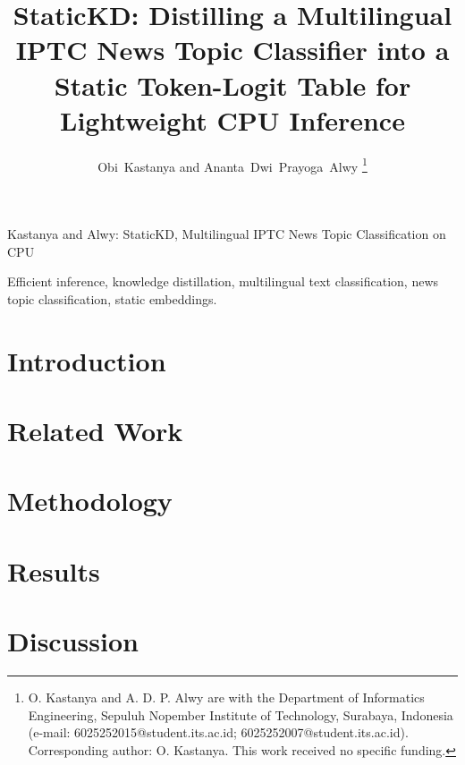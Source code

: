\documentclass[journal]{IEEEtran}
\begin{document}
\title{StaticKD: Distilling a Multilingual IPTC News Topic Classifier into a Static Token-Logit Table for Lightweight CPU Inference}

\author{Obi~Kastanya and Ananta~Dwi~Prayoga~Alwy%
\thanks{O. Kastanya and A. D. P. Alwy are with the Department of Informatics Engineering, Sepuluh Nopember Institute of Technology, Surabaya, Indonesia (e-mail: 6025252015@student.its.ac.id; 6025252007@student.its.ac.id). Corresponding author: O. Kastanya. This work received no specific funding.}}

%
{Kastanya and Alwy: StaticKD, Multilingual IPTC News Topic Classification on CPU}

\maketitle

\begin{abstract}

\end{abstract}

\begin{IEEEkeywords}
Efficient inference, knowledge distillation, multilingual text classification, news topic classification, static embeddings.
\end{IEEEkeywords}

\section{Introduction}
\label{sec:introduction}


\section{Related Work}
\label{sec:related}


\section{Methodology}
\label{sec:method}


\section{Results}
\label{sec:results}


\section{Discussion}
\label{sec:discussion}

\end{document}
